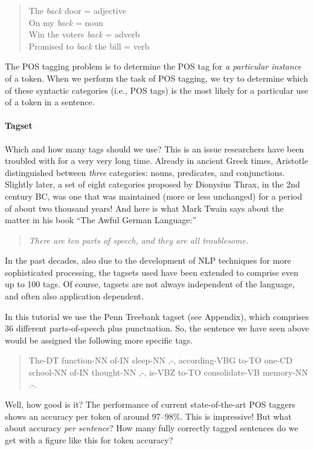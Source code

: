 \documentclass[11pt]{article}
\begin{document}
\begin{quote}
The \textit{back} door = adjective\\
On my \textit{back} = noun\\
Win the voters \textit{back} = adverb\\
Promised to \textit{back} the bill = verb
\end{quote}

The POS tagging problem is to determine the POS tag for \textit{a
  particular instance} of a token.  When we perform the task of POS
tagging, we try to determine which of these syntactic categories
(i.e., POS tags) is the most likely for a particular use of a token in
a sentence.


\paragraph{Tagset} Which and how many tags should we use? This is an
issue researchers have been troubled with for a very very long time.
Already in ancient Greek times, Aristotle distinguished between
\textit{three} categories: nouns, predicates, and conjunctions.
Slightly later, a set of eight categories proposed by Dionysius Thrax,
in the 2nd century BC, was one that was maintained (more or less
unchanged) for a period of about two thousand years! And here is what Mark Twain 
says about the matter in his book ``The Awful German Language:''

\begin{quote}
\it There are ten parts of speech, and they are all troublesome.
\end{quote}

In the past decades, also due to the development of NLP techniques for
more sophisticated processing, the tagsets used have been extended to
comprise even up to 100 tags. Of course, tagsets are not always
independent of the language, and often also application dependent.

In this tutorial we use the Penn Treebank tagset (see Appendix), which comprises 36
different parts-of-speech plus punctuation. So, the sentence we have
seen above would be assigned the following more specific tags.

\begin{quote}
The-DT function-NN of-IN sleep-NN ,-, according-VBG to-TO one-CD school-NN of-IN thought-NN ,-, is-VBZ to-TO consolidate-VB memory-NN .-.
\end{quote}

Well, how good is it? The performance of current state-of-the-art POS
taggers shows an accuracy per token of around 97--98\%. This is
impressive! But what about accuracy \textit{per sentence}? How many
fully correctly tagged sentences do we get with a figure like this for
token accuracy?
\end{document}
